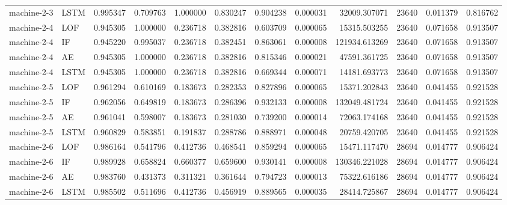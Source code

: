 \begin{longtable}{llrrrrrrrrrr}
machine-2-3 & LSTM & 0.995347 & 0.709763 & 1.000000 & 0.830247 & 0.904238 & 0.000031 & 32009.307071 & 23640 & 0.011379 & 0.816762 \\
machine-2-4 & LOF & 0.945305 & 1.000000 & 0.236718 & 0.382816 & 0.603709 & 0.000065 & 15315.503255 & 23640 & 0.071658 & 0.913507 \\
machine-2-4 & IF & 0.945220 & 0.995037 & 0.236718 & 0.382451 & 0.863061 & 0.000008 & 121934.613269 & 23640 & 0.071658 & 0.913507 \\
machine-2-4 & AE & 0.945305 & 1.000000 & 0.236718 & 0.382816 & 0.815346 & 0.000021 & 47591.361725 & 23640 & 0.071658 & 0.913507 \\
machine-2-4 & LSTM & 0.945305 & 1.000000 & 0.236718 & 0.382816 & 0.669344 & 0.000071 & 14181.693773 & 23640 & 0.071658 & 0.913507 \\
machine-2-5 & LOF & 0.961294 & 0.610169 & 0.183673 & 0.282353 & 0.827896 & 0.000065 & 15371.202843 & 23640 & 0.041455 & 0.921528 \\
machine-2-5 & IF & 0.962056 & 0.649819 & 0.183673 & 0.286396 & 0.932133 & 0.000008 & 132049.481724 & 23640 & 0.041455 & 0.921528 \\
machine-2-5 & AE & 0.961041 & 0.598007 & 0.183673 & 0.281030 & 0.739200 & 0.000014 & 72063.174168 & 23640 & 0.041455 & 0.921528 \\
machine-2-5 & LSTM & 0.960829 & 0.583851 & 0.191837 & 0.288786 & 0.888971 & 0.000048 & 20759.420705 & 23640 & 0.041455 & 0.921528 \\
machine-2-6 & LOF & 0.986164 & 0.541796 & 0.412736 & 0.468541 & 0.859294 & 0.000065 & 15471.117470 & 28694 & 0.014777 & 0.906424 \\
machine-2-6 & IF & 0.989928 & 0.658824 & 0.660377 & 0.659600 & 0.930141 & 0.000008 & 130346.221028 & 28694 & 0.014777 & 0.906424 \\
machine-2-6 & AE & 0.983760 & 0.431373 & 0.311321 & 0.361644 & 0.794723 & 0.000013 & 75322.616186 & 28694 & 0.014777 & 0.906424 \\
machine-2-6 & LSTM & 0.985502 & 0.511696 & 0.412736 & 0.456919 & 0.889565 & 0.000035 & 28414.725867 & 28694 & 0.014777 & 0.906424 \\
\end{longtable}
